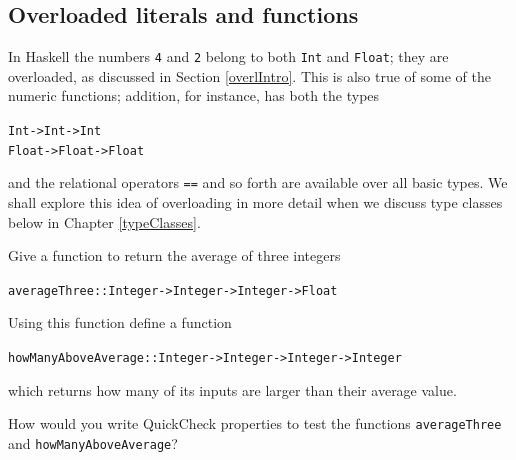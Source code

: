 \begin{figure}[t]
\end{figure}



\subsection*{Overloaded literals and functions}

In Haskell the numbers \texttt{4} and \texttt{2}
belong to both 
\texttt{Int} and \texttt{Float}; they are overloaded, as discussed in
Section \ref{overlIntro}.  This is
also true of some of the numeric functions; addition, for instance, has both
the types
\begin{alltt}
Int -> Int -> Int
Float -> Float -> Float
\end{alltt}
and the relational operators \texttt{==} and so forth are available over
all basic types.
We shall explore this idea of overloading in more detail
when we discuss type classes below in Chapter \ref{typeClasses}.



\begin{exercises}
\item
Give a function to return the average of three integers
\begin{alltt}
averageThree :: Integer -> Integer -> Integer -> Float
\end{alltt}
Using this function define a function
\begin{alltt}
howManyAboveAverage :: Integer -> Integer -> Integer -> Integer
\end{alltt}
which returns how many
of its inputs are larger than their average value.

\item
How would you write QuickCheck properties to test the functions \texttt{averageThree} and \texttt{howManyAboveAverage}?

\end{exercises}

